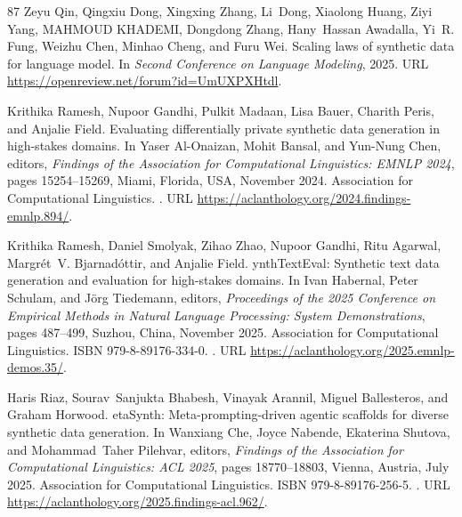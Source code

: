 \begin{thebibliography}{87}
Zeyu Qin, Qingxiu Dong, Xingxing Zhang, Li~Dong, Xiaolong Huang, Ziyi Yang, MAHMOUD KHADEMI, Dongdong Zhang, Hany~Hassan Awadalla, Yi~R. Fung, Weizhu Chen, Minhao Cheng, and Furu Wei.
\newblock Scaling laws of synthetic data for language model.
\newblock In \emph{Second Conference on Language Modeling}, 2025.
\newblock URL \url{https://openreview.net/forum?id=UmUXPXHtdl}.

Krithika Ramesh, Nupoor Gandhi, Pulkit Madaan, Lisa Bauer, Charith Peris, and Anjalie Field.
\newblock Evaluating differentially private synthetic data generation in high-stakes domains.
\newblock In Yaser Al-Onaizan, Mohit Bansal, and Yun-Nung Chen, editors, \emph{Findings of the Association for Computational Linguistics: EMNLP 2024}, pages 15254--15269, Miami, Florida, USA, November 2024. Association for Computational Linguistics.
\newblock {}.
\newblock URL \url{https://aclanthology.org/2024.findings-emnlp.894/}.

Krithika Ramesh, Daniel Smolyak, Zihao Zhao, Nupoor Gandhi, Ritu Agarwal, Margr{\'e}t~V. Bjarnad{\'o}ttir, and Anjalie Field.
ynth{T}ext{E}val: Synthetic text data generation and evaluation for high-stakes domains.
\newblock In Ivan Habernal, Peter Schulam, and J{\"o}rg Tiedemann, editors, \emph{Proceedings of the 2025 Conference on Empirical Methods in Natural Language Processing: System Demonstrations}, pages 487--499, Suzhou, China, November 2025. Association for Computational Linguistics.
\newblock ISBN 979-8-89176-334-0.
\newblock {}.
\newblock URL \url{https://aclanthology.org/2025.emnlp-demos.35/}.

Haris Riaz, Sourav~Sanjukta Bhabesh, Vinayak Arannil, Miguel Ballesteros, and Graham Horwood.
eta{S}ynth: Meta-prompting-driven agentic scaffolds for diverse synthetic data generation.
\newblock In Wanxiang Che, Joyce Nabende, Ekaterina Shutova, and Mohammad~Taher Pilehvar, editors, \emph{Findings of the Association for Computational Linguistics: ACL 2025}, pages 18770--18803, Vienna, Austria, July 2025. Association for Computational Linguistics.
\newblock ISBN 979-8-89176-256-5.
\newblock {}.
\newblock URL \url{https://aclanthology.org/2025.findings-acl.962/}.


\end{thebibliography}
